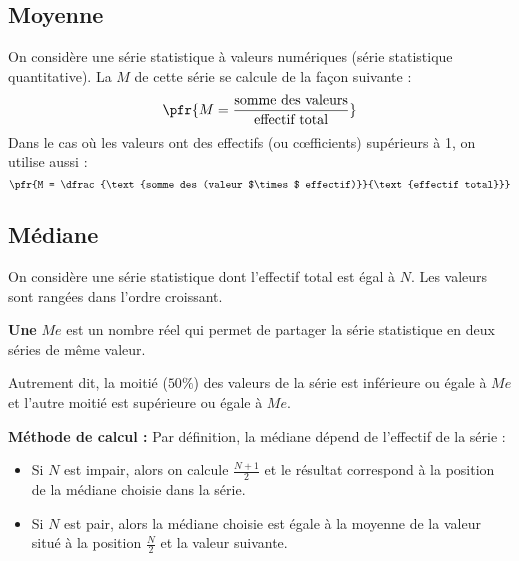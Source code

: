 \documentclass[10pt,openright,twoside,french]{book}
\begin{document}
\subsection{Moyenne}

\begin{Defi}
    On considère une série statistique à valeurs numériques (série statistique quantitative). La  $M$ de cette série se calcule de la façon suivante :
    \[\pfr{M = \dfrac{\text{somme des valeurs}}{\text{effectif total}}}\]
    Dans le cas où les valeurs ont des effectifs (ou c{\oe}fficients) supérieurs à 1, on utilise aussi :
    \[\pfr{M = \dfrac{\text{somme des (valeur $\times$ effectif)}}{\text{effectif total}}}\]
\end{Defi}


\begin{Exemple}

\end{Exemple}\clearpage

\subsection{Médiane}

\begin{Defi}
    On considère une série statistique dont l'effectif total est égal à $N$. Les valeurs sont rangées dans l'ordre croissant.

    \textbf{Une}  $Me$ est un nombre réel qui permet de partager la série statistique en deux séries de même valeur.

    Autrement dit, la moitié ($50\%$) des valeurs de la série est inférieure ou égale à $Me$ et l'autre moitié est supérieure ou égale à $Me$.

\begin{center}
\end{center}
\end{Defi}

\textbf{Méthode de calcul :} Par définition, la médiane dépend de l'effectif de la série :
\begin{itemize}
    \item Si $N$ est impair, alors on calcule $\frac{N + 1}{2}$ et le résultat correspond à la position de la médiane choisie dans la série.
    \item Si $N$ est pair, alors la médiane choisie est égale à la moyenne de la valeur situé à la position $\frac N 2$ et la valeur suivante.
\end{itemize}
\end{document}
